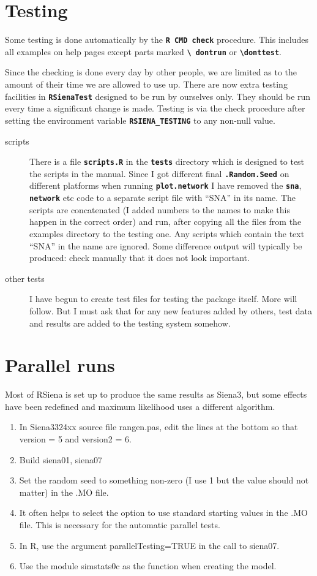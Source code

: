 \documentclass[12pt, a4paper]{article}
\renewcommand{\=}{\,=\,}
\newcommand{\+}{\,+\,}
\newcommand{\sfn}[1]{\textbf{\texttt{#1}}}
\begin{document}
\section{Testing}
Some testing is done automatically  by the \sfn{R CMD check} procedure. This
includes all examples on help pages except parts marked \sfn{\textbackslash
  dontrun} or \sfn{\textbackslash donttest}.

Since the checking is done every day by other people, we are limited as to the
amount of their time we are allowed to use up. There are now extra testing
facilities in \sfn{RSienaTest} designed to be run by ourselves only. They should
be run every time a significant change is made.  Testing is via the check
procedure after setting the environment variable \sfn{RSIENA\_TESTING} to any
non-null value.
\begin{description}
\item[scripts] There is a file \sfn{scripts.R} in the \sfn{tests} directory
  which is designed to test the scripts in the manual. Since I got different
  final \sfn{.Random.Seed} on different platforms when running
  \sfn{plot.network} I have removed the \sfn{sna}, \sfn{network} etc code to a
  separate script file with ``SNA'' in its name.  The
  scripts are concatenated (I added numbers to the names to make this happen in
  the correct order) and run, after copying all the files from the examples
  directory to the testing one. Any scripts which contain the text ``SNA'' in the
  name are ignored. Some difference output will typically be produced: check
  manually that it does not look important.
\item[other tests]
I have begun to create test files for testing the package itself. More will
follow. But I must ask that for any new features added by others, test data and
results are added to the testing system somehow.
\end{description}
\section{Parallel runs}
Most of RSiena is set up to produce the same results as Siena3, but some effects
have been redefined and maximum likelihood uses a different algorithm.
\begin{enumerate}
\item In Siena3324xx source file \textsf{rangen.pas}, edit the lines at the
  bottom so that \textsf{version = 5} and \textsf{version2 = 6}.
\item Build siena01, siena07
\item Set the random seed to something non-zero (I use 1 but the value
  should not matter) in the .MO file.
\item It often helps to select the option to use standard starting values in the
  .MO file. This is necessary for the automatic parallel tests.
\item In R, use the argument \textsf{parallelTesting=TRUE} in the call to
  \textsf{siena07}.
\item Use the module \textsf{simstats0c} as the function when creating the
  model.
\end{enumerate}
\end{document}
